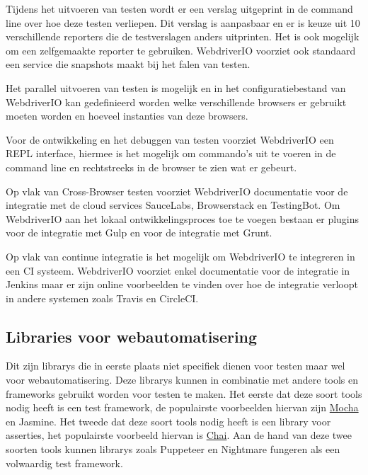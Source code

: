 Tijdens het uitvoeren van testen wordt er een verslag uitgeprint in de command line  over hoe deze testen verliepen. Dit verslag is aanpasbaar en er is keuze uit 10 verschillende reporters die de testverslagen anders uitprinten. Het is ook mogelijk om een zelfgemaakte reporter te gebruiken. WebdriverIO voorziet ook standaard een service die \glspl{snapshot} maakt bij het falen van testen.

Het parallel uitvoeren van testen is mogelijk en in het configuratiebestand van WebdriverIO kan gedefinieerd worden welke verschillende browsers er gebruikt moeten worden en hoeveel instanties van deze browsers.

Voor de ontwikkeling en het debuggen van testen voorziet WebdriverIO een \gls{REPL} interface, hiermee is het mogelijk om commando's uit te voeren in de command line en rechtstreeks in de browser te zien wat er gebeurt.

Op vlak van Cross-Browser testen voorziet WebdriverIO documentatie voor de integratie met de cloud services SauceLabs, Browserstack en TestingBot. Om WebdriverIO aan het lokaal ontwikkelingsproces toe te voegen bestaan er plugins voor de integratie met \gls{Gulp} en voor de integratie met \gls{Grunt}.

\clearpage
Op vlak van continue integratie is het mogelijk om WebdriverIO te integreren in een \gls{CI} systeem. WebdriverIO voorziet enkel documentatie voor de integratie in Jenkins maar er zijn online voorbeelden te vinden over hoe de integratie verloopt in andere systemen zoals Travis en CircleCI.

\subsection{Libraries voor webautomatisering}

Dit zijn \glspl{library} die in eerste plaats niet specifiek dienen voor testen maar wel voor webautomatisering. Deze \glspl{library} kunnen in combinatie met andere \glspl{tool} en \glspl{framework} gebruikt worden voor testen te maken. Het eerste dat deze soort \glspl{tool} nodig heeft is een test \gls{framework}, de populairste voorbeelden hiervan zijn \hyperref[mocha]{Mocha} en Jasmine. Het tweede dat deze soort \glspl{tool} nodig heeft is een \gls{library} voor \glspl{assertie}, het populairste voorbeeld hiervan is \hyperref[chai]{Chai}. Aan de hand van deze twee soorten \glspl{tool} kunnen \glspl{library} zoals Puppeteer en Nightmare fungeren als een volwaardig test \gls{framework}.

